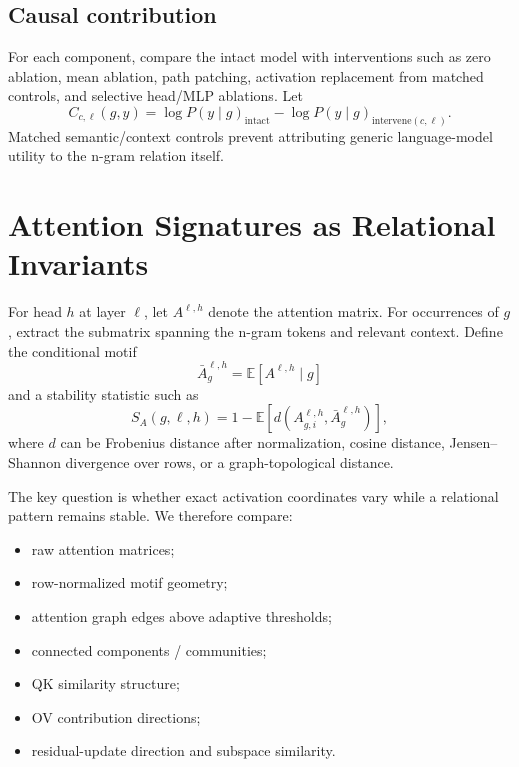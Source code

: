 \documentclass[10pt]{article}
\begin{document}
\subsection{Causal contribution}
For each component, compare the intact model with interventions such as zero ablation, mean ablation, path patching, activation replacement from matched controls, and selective head/MLP ablations. Let
\begin{equation}
 C_{c,\ell}(g,y)=\log P(y\mid g)_{\text{intact}}-\log P(y\mid g)_{\text{intervene}(c,\ell)}.
\end{equation}
Matched semantic/context controls prevent attributing generic language-model utility to the n-gram relation itself.

\section{Attention Signatures as Relational Invariants}
For head $h$ at layer $\ell$, let $A^{\ell,h}$ denote the attention matrix. For occurrences of $g$, extract the submatrix spanning the n-gram tokens and relevant context. Define the conditional motif
\begin{equation}
 \bar A^{\ell,h}_g=\mathbb E[A^{\ell,h}\mid g]
\end{equation}
and a stability statistic such as
\begin{equation}
 S_A(g,\ell,h)=1-\mathbb E\left[d(A^{\ell,h}_{g,i},\bar A^{\ell,h}_g)\right],
\end{equation}
where $d$ can be Frobenius distance after normalization, cosine distance, Jensen--Shannon divergence over rows, or a graph-topological distance.

The key question is whether exact activation coordinates vary while a relational pattern remains stable. We therefore compare:
\begin{itemize}
    \item raw attention matrices;
    \item row-normalized motif geometry;
    \item attention graph edges above adaptive thresholds;
    \item connected components / communities;
    \item QK similarity structure;
    \item OV contribution directions;
    \item residual-update direction and subspace similarity.
\end{itemize}
\end{document}
